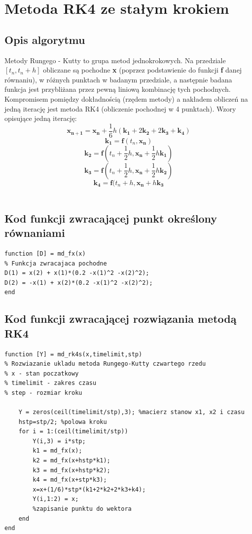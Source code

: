 \documentclass[a4paper, 11pt]{article}
\begin{document}
\section{Metoda RK4 ze stałym krokiem}

\subsection{Opis algorytmu}
Metody Rungego - Kutty to grupa metod jednokrokowych. Na przedziale $[t_{n}, t_{n} + h]$ obliczane są pochodne \textbf{x} (poprzez podstawienie do funkcji \textbf{f} danej równaniu), w różnych punktach w badanym przedziale, a następnie badana funkcja jest przybliżana przez pewną liniową kombinację tych pochodnych. Kompromisem pomiędzy dokładnością (rzędem metody) a nakładem obliczeń na jedną iterację jest metoda RK4 (obliczenie pochodnej w 4 punktach). Wzory opisujące jedną iterację:
$$ \mathbf{x_{n+1}} = \mathbf{x_{n}} + \frac{1}{6}h(\mathbf{k_{1}} + 2\mathbf{k_{2}} + 2\mathbf{k_{3}} + \mathbf{k_{4}})$$
$$\mathbf{k_{1}} = \mathbf{f}(t_{n}, \mathbf{x_{n}})$$
$$\mathbf{k_{2}} = \mathbf{f}(t_{n}+\frac{1}{2}h, \mathbf{x_{n}} + \frac{1}{2}h\mathbf{k_{1}})$$
$$\mathbf{k_{3}} = \mathbf{f}(t_{n}+\frac{1}{2}h, \mathbf{x_{n}} + \frac{1}{2}h\mathbf{k_{2}})$$
$$\mathbf{k_{4}} = \mathbf{f}(t_{n}+h, \mathbf{x_{n}} + h\mathbf{k_{3}}$$\\



\subsection{Kod funkcji zwracającej punkt określony równaniami}
\begin{lstlisting}
function [D] = md_fx(x)
% Funkcja zwracajaca pochodne  
D(1) = x(2) + x(1)*(0.2 -x(1)^2 -x(2)^2); 
D(2) = -x(1) + x(2)*(0.2 -x(1)^2 -x(2)^2);
end
\end{lstlisting}
\hspace{5cm}
\subsection{Kod funkcji zwracającej rozwiązania metodą RK4}
\begin{lstlisting}
function [Y] = md_rk4s(x,timelimit,stp)
% Rozwiazanie ukladu metoda Rungego-Kutty czwartego rzedu
% x - stan poczatkowy
% timelimit - zakres czasu
% step - rozmiar kroku

    Y = zeros(ceil(timelimit/stp),3); %macierz stanow x1, x2 i czasu
    hstp=stp/2; %polowa kroku
    for i = 1:(ceil(timelimit/stp))
        Y(i,3) = i*stp;  
        k1 = md_fx(x); 
        k2 = md_fx(x+hstp*k1); 
        k3 = md_fx(x+hstp*k2); 
        k4 = md_fx(x+stp*k3); 
        x=x+(1/6)*stp*(k1+2*k2+2*k3+k4); 
        Y(i,1:2) = x;  
        %zapisanie punktu do wektora
    end
end
\end{lstlisting}
\end{document}
